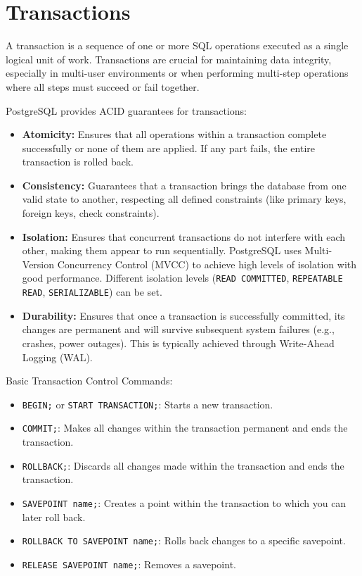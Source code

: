 \documentclass[12pt]{book}
\begin{document}
\section{Transactions}

A transaction is a sequence of one or more SQL operations executed as a single logical unit of work. Transactions are crucial for maintaining data integrity, especially in multi-user environments or when performing multi-step operations where all steps must succeed or fail together.

PostgreSQL provides ACID guarantees for transactions:
\begin{itemize}
    \item \textbf{Atomicity:} Ensures that all operations within a transaction complete successfully or none of them are applied. If any part fails, the entire transaction is rolled back.
    \item \textbf{Consistency:} Guarantees that a transaction brings the database from one valid state to another, respecting all defined constraints (like primary keys, foreign keys, check constraints).
    \item \textbf{Isolation:} Ensures that concurrent transactions do not interfere with each other, making them appear to run sequentially. PostgreSQL uses Multi-Version Concurrency Control (MVCC) to achieve high levels of isolation with good performance. Different isolation levels (\texttt{READ COMMITTED}, \texttt{REPEATABLE READ}, \texttt{SERIALIZABLE}) can be set.
    \item \textbf{Durability:} Ensures that once a transaction is successfully committed, its changes are permanent and will survive subsequent system failures (e.g., crashes, power outages). This is typically achieved through Write-Ahead Logging (WAL).
\end{itemize}

Basic Transaction Control Commands:
\begin{itemize}
    \item \texttt{BEGIN;} or \texttt{START TRANSACTION;}: Starts a new transaction.
    \item \texttt{COMMIT;}: Makes all changes within the transaction permanent and ends the transaction.
    \item \texttt{ROLLBACK;}: Discards all changes made within the transaction and ends the transaction.
    \item \texttt{SAVEPOINT name;}: Creates a point within the transaction to which you can later roll back.
    \item \texttt{ROLLBACK TO SAVEPOINT name;}: Rolls back changes to a specific savepoint.
    \item \texttt{RELEASE SAVEPOINT name;}: Removes a savepoint.
\end{itemize}
\end{document}
